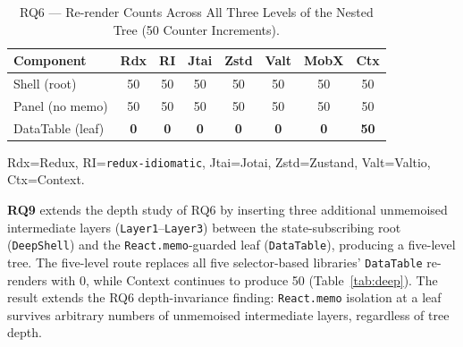 \documentclass[conference]{IEEEtran}
\newcommand{\code}[1]{\texttt{\small #1}}
\begin{document}
\begin{table}[tb]
\caption{RQ6 --- Re-render Counts Across All Three Levels of the Nested
Tree (50 Counter Increments).}
\label{tab:rq6}
\begin{center}
\scriptsize
\setlength{\tabcolsep}{2pt}
\begin{tabular}{lccccccc}
\toprule
\textbf{Component} & \textbf{Rdx} & \textbf{RI} & \textbf{Jtai}
  & \textbf{Zstd} & \textbf{Valt} & \textbf{MobX} & \textbf{Ctx} \\
\midrule
Shell (root)     & 50 & 50 & 50 & 50 & 50 & 50 & 50 \\
Panel (no memo)  & 50 & 50 & 50 & 50 & 50 & 50 & 50 \\
DataTable (leaf) & \textbf{0} & \textbf{0} & \textbf{0} & \textbf{0}
                 & \textbf{0} & \textbf{0} & \textbf{50} \\
\bottomrule
\end{tabular}
\end{center}
\parbox{\columnwidth}{\scriptsize
  Rdx=Redux, RI=\code{redux-idiomatic}, Jtai=Jotai, Zstd=Zustand,
  Valt=Valtio, Ctx=Context.}
\end{table}

\textbf{RQ9} extends the depth study of RQ6 by inserting three
additional unmemoised intermediate layers (\code{Layer1}--\code{Layer3})
between the state-subscribing root (\code{DeepShell}) and the
\code{React.memo}-guarded leaf (\code{DataTable}), producing a
five-level tree.  The five-level route replaces all
five selector-based libraries' \code{DataTable} re-renders with 0, while Context
continues to produce 50 (Table~\ref{tab:deep}).  The result
extends the RQ6 depth-invariance finding: \code{React.memo} isolation
at a leaf survives arbitrary numbers of unmemoised intermediate layers,
regardless of tree depth.
\end{document}
